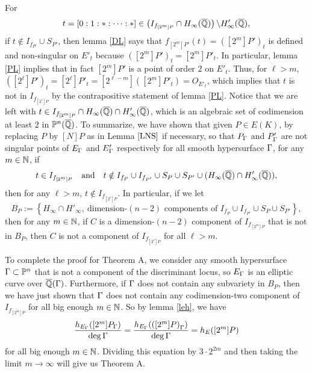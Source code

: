 \documentclass[12pt,reqno]{amsart}
\begin{document}
For $$t=[0:1:*: \dots:*] \in \left(I_{f_{[2^m]P}} \cap H_\infty(\overline{\mathbb{Q}})\right) \backslash H'_\infty(\overline{\mathbb{Q}}),$$ if $t \not \in  I_{f_{P'}}\cup S_{P'}$, then lemma \ref{DL} says that $f_{[2^m]P'}(t)=([2^m]P')_t$ is defined and non-singular on $E'_t$ because $([2^m]P')_t=[2^m]P'_t$. In particular, lemma \ref{PL} implies that in fact $[2^m]P'$ is a point of order $2$ on $E'_t$. Thus, for $\ell > m$, $([2^\ell]P')_t=[2^\ell]P'_t=[2^{\ell-m}]\left([2^m]P'_t\right)=O_{E'_t}$, which implies that $t$ is not in $I_{f_{[2^\ell]P}}$ by the contrapositive statement of lemma \ref{PL}. Notice that we are left with $t \in I_{f_{[2^m]P}} \cap H_\infty(\overline{\mathbb{Q}})\cap H'_\infty(\overline{\mathbb{Q}})$, which is an algebraic set of codimension at least $2$ in $\mathbb{P}^n(\overline{\mathbb{Q}})$. To summarize, we have shown that given $P\in E(K)$, by replacing $P$ by $[N]P$ as in Lemma $\ref{LNS}$ if necessary, so that $P_\Gamma$ and $P'_\Gamma$ are not singular points of $E_\Gamma$ and $E'_\Gamma$ respectively for all smooth hypersurface $\Gamma$, for any $m \in \mathbb{N}$, if 
$$
  t \in I_{f_{[2^m]P}}
  \quad\text{and}\quad
  t \notin I_{f_P} \cup I_{f_{P'}} \cup S_P \cup S_{P'} \cup (H_\infty(\overline{\mathbb{Q}})\cap H'_\infty(\overline{\mathbb{Q}})),
$$
then for any $\ell>m$, $t \not \in I_{f_{[2^\ell]P}}$. In particular, if we let
$$B_P:=\left\{ H_\infty\cap H'_\infty, \ \text{dimension-$(n-2)$ components of }I_{f_P}\cup I_{f_{P'}}\cup S_P\cup S_{P'}   \right\}, $$then for any $m \in \mathbb{N}$, if $C$ is a dimension-$(n-2)$ component of $I_{f_{[2^m]P}}$ that is not in $B_P$, then $C$ is not a component of  $I_{f_{[2^\ell]P}}$ for all $\ell > m$. 

To complete the proof for Theorem A, we consider any smooth hypersurface $\Gamma \subset \mathbb{P}^n$ that is not a component of the discriminant locus, so $E_\Gamma$ is an elliptic curve over $\overline{\mathbb{Q}}(\Gamma)$. Furthermore, if $\Gamma$ does not contain any subvariety in $B_P$, then we have just shown that $\Gamma$ does not contain any codimension-two component of $I_{f_{[2^m]P}}$ for all big enough $m \in \mathbb{N}$. So by lemma \ref{leh}, we have $$\frac{h_{E_\Gamma}([2^m]P_\Gamma)}{\deg \Gamma}=\frac{h_{E_\Gamma}(\left([2^m]P\right)_\Gamma)}{\deg \Gamma}= h_E([2^m]P) $$ for all big enough $m \in \mathbb{N}$. Dividing this equation by $3 \cdot 2^{2m}$ and then taking the limit $m\rightarrow \infty$ will give us Theorem A.






 
\end{document}
